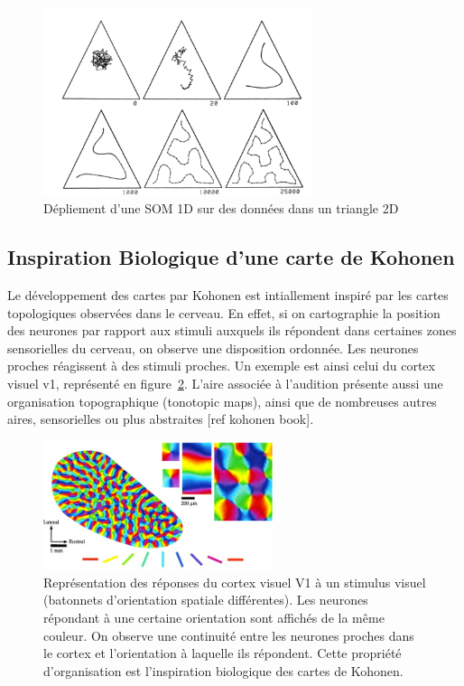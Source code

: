 \begin{figure}
\centering
\includegraphics[width=0.7\textwidth]{som1d}
\caption{Dépliement d'une SOM 1D sur des données dans un triangle 2D \cite{Kohonen1995SelfOrganizingM}\label{fig:som1d}}

\end{figure}

\subsection{Inspiration Biologique d'une carte de Kohonen}

Le développement des cartes par Kohonen est intiallement inspiré par les cartes topologiques observées dans le cerveau. En effet, si on cartographie la position des neurones par rapport aux stimuli auxquels ils répondent dans certaines zones sensorielles du cerveau, on observe une disposition ordonnée. Les neurones proches réagissent à des stimuli proches. Un exemple est ainsi celui du cortex visuel v1, représenté en figure~\ref{fig:v1}. L'aire associée à l'audition présente aussi une organisation topographique (tonotopic maps), ainsi que de nombreuses autres aires, sensorielles ou plus abstraites [ref kohonen book].

\begin{figure}
\centering
\includegraphics[width=0.6\textwidth]{v1.jpg}
\caption{Représentation des réponses du cortex visuel V1 à un stimulus visuel (batonnets d'orientation spatiale différentes). Les neurones répondant à une certaine orientation sont affichés de la même couleur. On observe une continuité entre les neurones proches dans le cortex et l'orientation à laquelle ils répondent. Cette propriété d'organisation est l'inspiration biologique des cartes de Kohonen. }
\label{fig:v1}
\end{figure}



